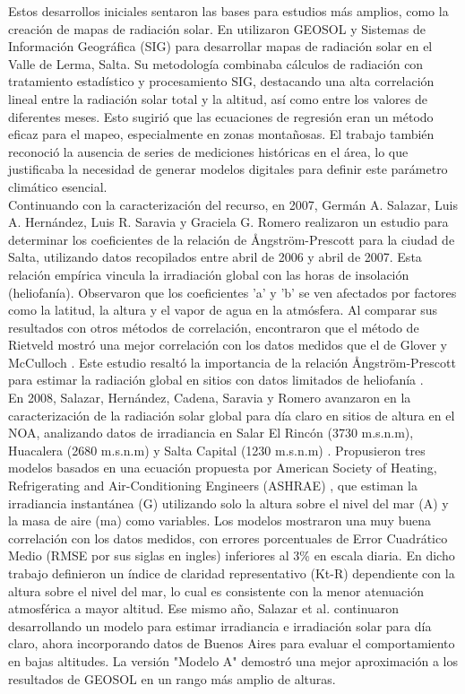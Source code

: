 Estos desarrollos iniciales sentaron las bases para estudios más amplios, como la creación de mapas de radiación solar. En \citep{Belmonte2006} utilizaron GEOSOL y Sistemas de Información Geográfica (SIG) para desarrollar mapas de radiación solar en el Valle de Lerma, Salta. Su metodología combinaba cálculos de radiación con tratamiento estadístico y procesamiento SIG, destacando una alta correlación lineal entre la radiación solar total y la altitud, así como entre los valores de diferentes meses. Esto sugirió que las ecuaciones de regresión eran un método eficaz para el mapeo, especialmente en zonas montañosas. El trabajo también reconoció la ausencia de series de mediciones históricas en el área, lo que justificaba la necesidad de generar modelos digitales para definir este parámetro climático esencial.\\

Continuando con la caracterización del recurso, en 2007, Germán A. Salazar, Luis A. Hernández, Luis R. Saravia y Graciela G. Romero realizaron un estudio para determinar los coeficientes de la relación de Ångström-Prescott \citep{angstrom1924,prescott1940} para la ciudad de Salta, utilizando datos recopilados entre abril de 2006 y abril de 2007. Esta relación empírica vincula la irradiación global con las horas de insolación (heliofanía). Observaron que los coeficientes 'a' y 'b' se ven afectados por factores como la latitud, la altura y el vapor de agua en la atmósfera. Al comparar sus resultados con otros métodos de correlación, encontraron que el método de Rietveld \citep{Rietveld1978} mostró una mejor correlación con los datos medidos que el de Glover y McCulloch \citep{Glover1958}. Este estudio resaltó la importancia de la relación Ångström-Prescott para estimar la radiación global en sitios con datos limitados de heliofanía \citep{Salazar2007}.\\ 

En 2008, Salazar, Hernández, Cadena, Saravia y Romero avanzaron en la caracterización de la radiación solar global para día claro en sitios de altura en el NOA, analizando datos de irradiancia en Salar El Rincón (3730 m.s.n.m), Huacalera (2680 m.s.n.m) y Salta Capital (1230 m.s.n.m) \citep{Salazar2008a}. Propusieron tres modelos basados en una ecuación propuesta por American Society of Heating, Refrigerating and Air-Conditioning Engineers (ASHRAE) \citep{MANI1980}, que estiman la irradiancia instantánea (G) utilizando solo la altura sobre el nivel del mar (A) y la masa de aire (ma) como variables. Los modelos mostraron una muy buena correlación con los datos medidos, con errores porcentuales de Error Cuadrático Medio (RMSE por sus siglas en ingles) inferiores al 3\% en escala diaria. En dicho trabajo definieron un índice de claridad representativo (Kt-R) dependiente con la altura sobre el nivel del mar, lo cual es consistente con la menor atenuación atmosférica a mayor altitud. Ese mismo año, Salazar et al. continuaron desarrollando un modelo para estimar irradiancia e irradiación solar para día claro, ahora incorporando datos de Buenos Aires para evaluar el comportamiento en bajas altitudes. La versión "Modelo A" demostró una mejor aproximación a los resultados de GEOSOL en un rango más amplio de alturas.\\

